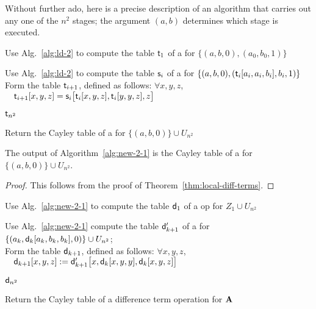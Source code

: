 Without further ado, here is a precise description of an algorithm that carries out any one
of the $n^2$ stages; the argument $(a,b)$ determines which stage is executed.
\begin{algorithm}

  Use Alg.~\ref{alg:ld-2} to compute the table $\mathsf{t}_1$ of a \ldto for $\{(a,b, 0), (a_0, b_0, 1)\}$\;

   {
    Use Alg.~\ref{alg:ld-2} to compute the table $\mathsf{s}_i$ of a \ldto for $\{(a,b, 0), (\mathsf{t}_i[a_i, a_i, b_i], b_i, 1)\}$\\[6pt]
    Form the table $\mathsf{t}_{i+1}$, defined as follows: $\forall x,y,z$,\\
    $\quad \mathsf{t}_{i+1}[x,y,z] = \mathsf{s}_i\bigl[\mathsf{t}_i[x,y,z], \mathsf{t}_i[y,y,z], z\bigr]$\;
  }

  \Return $\mathsf{t}_{n^2}$
  \caption{Return the Cayley table of a \ldto for $\{(a,b,0)\}\cup U_{n^2}$\label{alg:new-2-1}}
\end{algorithm}


\begin{lemma}
  \label{lem:19}
  The output of Algorithm~\ref{alg:new-2-1} is the Cayley table of a \ldto for
  $\{(a,b,0)\} \cup U_{n^2}$. %
\end{lemma}

\begin{proof}
  This follows from the proof of Theorem~\ref{thm:local-diff-terms}.
\end{proof}

\begin{algorithm}

  Use Alg.~\ref{alg:new-2-1} to compute the table $\mathsf{d}_1$ of a \ldt op for
  $Z_1 \cup U_{n^2}$\; %

   {

    Use Alg.~\ref{alg:new-2-1} compute the table $\mathsf{d}'_{k+1}$ of a \ldto for $\{(a_k, \mathsf{d}_{k}[a_k, b_k, b_k], 0)\} \cup U_{n^2}$;\\[4pt]
    Form the table $\mathsf{d}_{k+1}$, defined as follows: $\forall x,y,z$,\\
    $\quad \mathsf{d}_{k+1}[x,y,z] := \mathsf{d}'_{k+1}\bigl[x, \mathsf{d}_{k}[x,y,y], \mathsf{d}_{k}[x,y,z]\bigr]$\;
  }
  \Return $\mathsf{d}_{n^2}$
  \caption{Return the Cayley table of a difference term operation for $\mathbf{A}$\label{alg:new-2-3}}
\end{algorithm}


